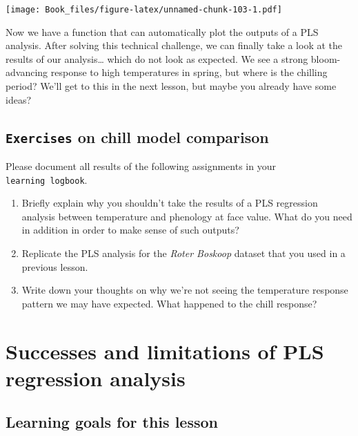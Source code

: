 \documentclass[
]{book}
\providecommand{\tightlist}{%
  \setlength{\itemsep}{0pt}\setlength{\parskip}{0pt}}
\begin{document}
\texttt{[image: Book\_files/figure-latex/unnamed-chunk-103-1.pdf]}

Now we have a function that can automatically plot the outputs of a PLS analysis. After solving this technical challenge, we can finally take a look at the results of our analysis\ldots{} which do not look as expected. We see a strong bloom-advancing response to high temperatures in spring, but where is the chilling period? We'll get to this in the next lesson, but maybe you already have some ideas?

\hypertarget{exercises_first_PLS}{%
\section*{\texorpdfstring{\texttt{Exercises} on chill model comparison}{Exercises on chill model comparison}}\label{exercises_first_PLS}}

Please document all results of the following assignments in your \texttt{learning\ logbook}.

\begin{enumerate}
\def\labelenumi{\arabic{enumi})}
\tightlist
\item
  Briefly explain why you shouldn't take the results of a PLS regression analysis between temperature and phenology at face value. What do you need in addition in order to make sense of such outputs?
\item
  Replicate the PLS analysis for the \emph{Roter Boskoop} dataset that you used in a previous lesson.
\item
  Write down your thoughts on why we're not seeing the temperature response pattern we may have expected. What happened to the chill response?
\end{enumerate}

\hypertarget{pls_reflection}{%
\chapter{Successes and limitations of PLS regression analysis}\label{pls_reflection}}

\hypertarget{goals_PLS_reflection}{%
\section*{Learning goals for this lesson}\label{goals_PLS_reflection}}
\end{document}

